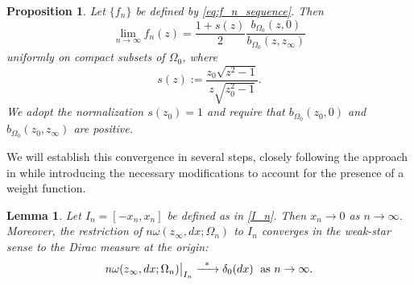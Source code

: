 \documentclass[12pt,oneside,reqno]{amsart}
\newtheorem{lemma}[theorem]{Lemma}
\newtheorem{proposition}[theorem]{Proposition}
\theoremstyle{definition}
\numberwithin{equation}{section}
\begin{document}
\begin{proposition}
		Let $\{f_n\}$ be defined by \eqref{eq:f_n_sequence}. Then
	\begin{equation} \label{limit f_n}
	   \lim_{n\rightarrow \infty}f_n(z)= \frac{1+s(z)}{2}\frac{b_{\Omega_0}(z,0)}{b_{\Omega_0}(z,z_\infty)}
	\end{equation}
	uniformly on compact subsets of $\Omega_0$, where
	\begin{equation}
		s(z) := \frac{z_0 \sqrt{z^2-1}}{z \sqrt{z_0^2-1}}.
		\label{eq:s_definition}
	\end{equation}
	We adopt the normalization $s(z_0)=1$ and require that $b_{\Omega_0}(z_0, 0)$ and $b_{\Omega_0}(z_0, z_\infty)$ are positive.
	\label{prop:asymptotics_of_real_problem}	
\end{proposition}

We will establish this convergence in several steps, closely following the approach in \cite{eichinger17} while introducing the necessary modifications to account for the presence of a weight function. 

\begin{lemma} \label{lem:intervals_shrinking}
	Let $I_n = [-x_n,x_n]$ be defined as in \eqref{I_n}. Then $x_n\rightarrow 0$ as $n\rightarrow \infty$. Moreover, the restriction of $n \omega(z_\infty,dx;\Omega_n)$ to $I_n$ converges in the weak-star sense to the Dirac measure at the origin:
	\begin{equation} \label{d0}
	   n\omega(z_\infty,dx; \Omega_n)\big\vert_{I_n}\xrightarrow{\enskip \ast\enskip}\delta_0(dx)
	\; \text{ as } n\rightarrow \infty.
	\end{equation}
\end{lemma}
\end{document}
